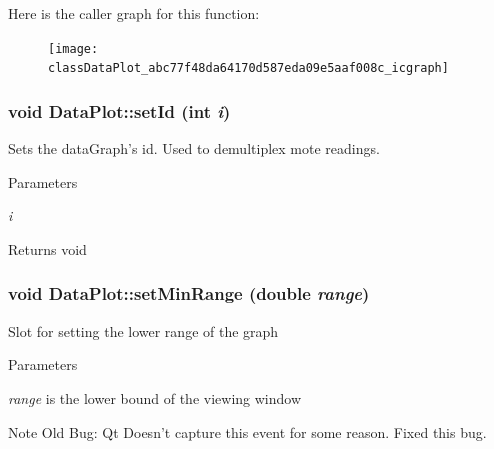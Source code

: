 Here is the caller graph for this function:\nopagebreak
\begin{figure}[H]
\begin{center}
\leavevmode
\texttt{[image: classDataPlot\_abc77f48da64170d587eda09e5aaf008c\_icgraph]}
\end{center}
\end{figure}


\hypertarget{classDataPlot_ab6af06dfac3585a7dc669ea333a0869d}{
\subsubsection[{setId}]{\setlength{\rightskip}{0pt plus 5cm}void DataPlot::setId (int {\em i})}}
\label{classDataPlot_ab6af06dfac3585a7dc669ea333a0869d}
Sets the dataGraph's id. Used to demultiplex mote readings. 
\begin{DoxyParams}{Parameters}
\item[{\em i}]\end{DoxyParams}
\begin{DoxyReturn}{Returns}
void 
\end{DoxyReturn}
\hypertarget{classDataPlot_ad101ac80563ee10322788946d791ea09}{
\subsubsection[{setMinRange}]{\setlength{\rightskip}{0pt plus 5cm}void DataPlot::setMinRange (double {\em range})}}
\label{classDataPlot_ad101ac80563ee10322788946d791ea09}
Slot for setting the lower range of the graph 
\begin{DoxyParams}{Parameters}
\item[{\em range}]is the lower bound of the viewing window \end{DoxyParams}


\begin{DoxyNote}{Note}
Old Bug: Qt Doesn't capture this event for some reason. Fixed this bug. 
\end{DoxyNote}


